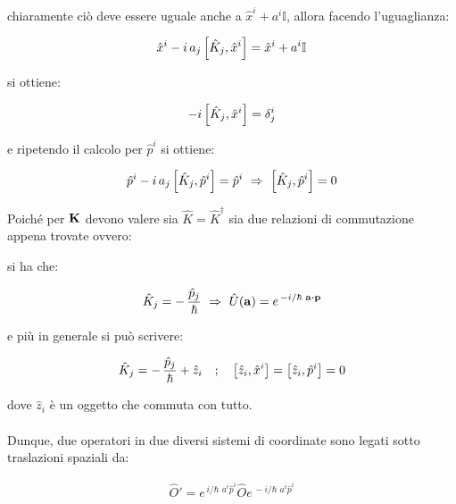 	chiaramente ciò deve essere uguale anche a $\hat{x}^i + a^i \mathbb{I}$, allora facendo l'uguaglianza:
	
\begin{align*}
	\hat{x}^i - i \, a_j \, \qty[ \hat{K}_j, \hat{x}^i ] = \hat{x}^i + a^i \mathbb{I}
\end{align*}

	si ottiene:
	
\begin{align*}
	- i \, \qty[ \hat{K}_j, \hat{x}^{i}] = \delta^i_j
\end{align*}

	e ripetendo il calcolo per $\hat{p}^i$ si ottiene:
	
\begin{align*}
	\hat{p}^i - i \, a_j \, \qty[\hat{K}_j, \hat{p}^i] = \hat{p}^i \, \, \Rightarrow \, \, \qty[\hat{K}_j, \hat{p}^i] = 0
\end{align*}
	
	Poiché per $\vb{K}$ devono valere sia $\hat{K} = \hat{K}^{\dagger}$ sia due relazioni di commutazione appena trovate ovvero:
	
	
	si ha che:
	
\begin{align*}
	\hat{K}_j = - \, \frac{\hat{p}_j}{\hbar} \, \, \Rightarrow \, \, \hat{U}(\vb{a}) = e^{\, - i/\hbar \, \, \vb{a} \vdot \vb{p} }
\end{align*}

	e più in generale si può scrivere:
	
\begin{align*}
	\hat{K}_j = - \, \frac{\hat{p}_j}{\hbar} + \hat{z}_i \quad ; \quad \qty[\hat{z}_i, \hat{x}^i] = \qty[\hat{z}_i, \hat{p}^i] = 0
\end{align*}

	dove $\hat{z}_i$ è un oggetto che commuta con tutto.
	\\
	\\
	Dunque, due operatori in due diversi sistemi di coordinate sono legati sotto traslazioni spaziali da:
	
\begin{align*}
	\hat{O}' = e^{\, i/\hbar \,\, a^i \hat{p}^i} \hat{O} e^{\, - i/\hbar \,\, a^i \hat{p}^i}
\end{align*}


